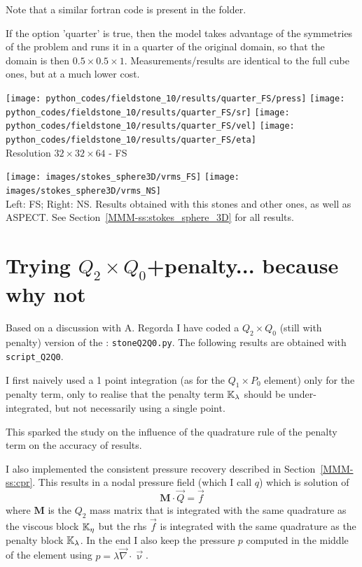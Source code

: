 Note that a similar fortran code is present in the folder. 

If the option 'quarter' is true, then the model takes advantage of the symmetries 
of the problem and runs it in a quarter of the original domain, so that 
the domain is then $0.5\times 0.5 \times 1$. Measurements/results are identical 
to the full cube ones, but at a much lower cost.

\begin{center}
\texttt{[image: python\_codes/fieldstone\_10/results/quarter\_FS/press]}
\texttt{[image: python\_codes/fieldstone\_10/results/quarter\_FS/sr]}
\texttt{[image: python\_codes/fieldstone\_10/results/quarter\_FS/vel]}
\texttt{[image: python\_codes/fieldstone\_10/results/quarter\_FS/eta]}\\
{\captionfont Resolution $32\times 32\times 64$ - FS}
\end{center}


\begin{center}
\texttt{[image: images/stokes\_sphere3D/vrms\_FS]}
\texttt{[image: images/stokes\_sphere3D/vrms\_NS]}\\
{\captionfont Left: FS; Right: NS. Results obtained with this stones and other ones, as well as ASPECT.
See Section~\ref{MMM-ss:stokes_sphere_3D} for all results.}
\end{center}

\newpage
\section*{Trying $Q_2\times Q_0$+penalty... because why not}

Based on a discussion with A. Regorda I have coded a $Q_2\times Q_0$
(still with penalty) version of the \stone: {\tt stoneQ2Q0.py}.
The following results are obtained with {\tt script\_Q2Q0}.

I first naively used a 1 point integration (as for the 
$Q_1 \times P_0$ element) only for the 
penalty term, only to realise that the penalty term ${\mathbb{K}}_\lambda$ should be 
under-integrated, but not necessarily using a single point. 

This sparked the study on the influence of the quadrature rule 
of the penalty term on the accuracy of results.

I also implemented the consistent pressure recovery described 
in Section~\ref{MMM-ss:cpr}.
This results in a nodal pressure field (which I call $q$) which is 
solution of 
\[
{\bm M} \cdot \vec{Q} = \vec{f}
\]
where ${\bm M}$ is the $Q_2$ mass matrix that 
is integrated with the same quadrature as the viscous block ${\mathbb{K}}_\eta$
but the rhs $\vec{f}$ is integrated with the same quadrature as 
the penalty block ${\mathbb{K}}_\lambda$.
In the end I also keep the pressure $p$ computed in the middle of the element
using $p= \lambda \vec\nabla\cdot \vec\upnu$.

